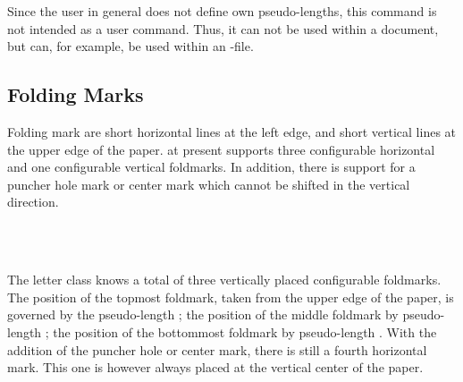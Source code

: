 Since the user in general does not define own pseudo-lengths, this command is
not intended as a user command. Thus, it can not be used within a document,
but can, for example, be used within an -file.%
%
%
%


\subsection{Folding Marks}
\label{sec:scrlttr2-experts.foldmarks}
%

Folding mark are short horizontal lines at the left edge, and short vertical
lines at the upper edge of the paper. \KOMAScript{} at present supports three
configurable horizontal and one configurable vertical foldmarks. In addition,
there is support for a puncher hole mark or center mark which cannot be
shifted in the vertical direction.

\begin{Declaration}
  \\
  \\
\end{Declaration}
%
%
%
The letter class  knows a total of three vertically placed
configurable foldmarks. The position of the topmost foldmark, taken from the
upper edge of the paper, is governed by the pseudo-length
; the position of the middle foldmark by pseudo-length
; the position of
the bottommost foldmark by pseudo-length . With the
addition of the puncher hole or center mark, there is still a fourth horizontal
mark. This one is however always placed at the vertical center of the paper.
\iffalse%
There's no pseudo-length for this last mark, because it vertical position is
not configurable.  \fi

